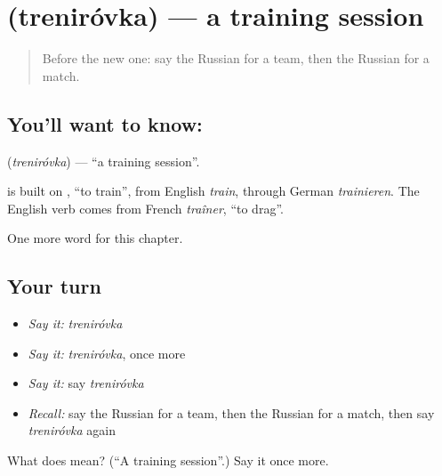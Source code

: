 \section[\texorpdfstring{\ru{тренировка} (treniróvka)}{тренировка (treniróvka)}]{ (treniróvka) — a training session}

\label{lesson:RU-C166-trenirovka}



\begin{quote}
Before the new one: say the Russian for a team, then the Russian for a match.
\end{quote}

\subsection*{You'll want to know: }
\textbf{} (\emph{treniróvka}) — \textquotedblleft{}a training session\textquotedblright{}.

\begin{cousinweb}
\textbf{} is built on \emph{}, \textquotedblleft{}to train\textquotedblright{}, from English \emph{train}, through German \emph{trainieren}. The English verb comes from French \emph{traîner}, \textquotedblleft{}to drag\textquotedblright{}.
\end{cousinweb}

\begin{grammarlens}[title={What you've built}]
One more word for this chapter.
\end{grammarlens}

\subsection*{Your turn}
\begin{itemize}
\raggedright
  \item \emph{Say it:} \emph{treniróvka}
  \item \emph{Say it:} \emph{treniróvka}, once more
  \item \emph{Say it:} say \emph{treniróvka}
  \item \emph{Recall:} say the Russian for a team, then the Russian for a match, then say \emph{treniróvka} again
\end{itemize}

\begin{tcolorbox}[breakable,colback=teal!4,colframe=teal!35!black,title={Before you move on}]
What does  mean? (\textquotedblleft{}A training session\textquotedblright{}.) Say it once more.
\end{tcolorbox}
